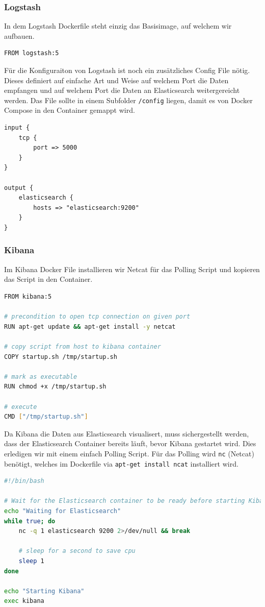 \subsubsection{Logstash} 
In dem Logstash Dockerfile steht einzig das Basisimage, auf welchem wir aufbauen.
\begin{lstlisting}[caption=Logstash Dockerfile, language=bash]
FROM logstash:5
\end{lstlisting}

Für die Konfiguraiton von Logstash ist noch ein zusätzliches Config File nötig. Dieses definiert auf einfache Art und Weise auf welchem Port die Daten empfangen und auf welchem Port die Daten an Elasticsearch weitergereicht werden. Das File sollte in einem Subfolder \lstinline|/config| liegen, damit es von Docker Compose in den Container gemappt wird.
\begin{lstlisting}[caption=./config/logstash.conf]
input {
	tcp {
		port => 5000
	}
}

output {
	elasticsearch {
		hosts => "elasticsearch:9200"
	}
}
\end{lstlisting}

\subsubsection{Kibana} 
Im Kibana Docker File installieren wir Netcat für das Polling Script und kopieren das Script in den Container.
\begin{lstlisting}[caption=Kibana Dockerfile, language=bash]
FROM kibana:5

# precondition to open tcp connection on given port
RUN apt-get update && apt-get install -y netcat

# copy script from host to kibana container
COPY startup.sh /tmp/startup.sh

# mark as executable
RUN chmod +x /tmp/startup.sh 

# execute
CMD ["/tmp/startup.sh"] 
\end{lstlisting}

Da Kibana die Daten aus Elasticsearch visualisert, muss sichergestellt werden, dass der Elasticsearch Container bereits läuft, bevor Kibana gestartet wird. Dies erledigen wir mit einem einfach Polling Script. Für das Polling wird \lstinline[]|nc| (Netcat) benötigt, welches im Dockerfile via \lstinline[]|apt-get install ncat| installiert wird. 
\begin{lstlisting}[caption=Kibana Pooling Script, language=bash]
#!/bin/bash

# Wait for the Elasticsearch container to be ready before starting Kibana.
echo "Waiting for Elasticsearch"
while true; do
	nc -q 1 elasticsearch 9200 2>/dev/null && break
	
	# sleep for a second to save cpu
	sleep 1
done

echo "Starting Kibana"
exec kibana
\end{lstlisting}

